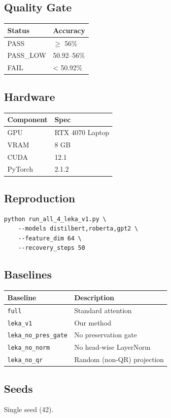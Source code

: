 \subsection{Quality Gate}

\begin{table}[H]
\centering
\small
\begin{tabular}{ll}
\toprule
\textbf{Status} & \textbf{Accuracy} \\
\midrule
PASS & $\ge$ 56\% \\
PASS\_LOW & 50.92--56\% \\
FAIL & < 50.92\% \\
\bottomrule
\end{tabular}
\end{table}

\subsection{Hardware}

\begin{table}[H]
\centering
\small
\begin{tabular}{ll}
\toprule
\textbf{Component} & \textbf{Spec} \\
\midrule
GPU & RTX 4070 Laptop \\
VRAM & 8 GB \\
CUDA & 12.1 \\
PyTorch & 2.1.2 \\
\bottomrule
\end{tabular}
\end{table}

\subsection{Reproduction}

\begin{lstlisting}
python run_all_4_leka_v1.py \
    --models distilbert,roberta,gpt2 \
    --feature_dim 64 \
    --recovery_steps 50
\end{lstlisting}

\subsection{Baselines}

\begin{table}[H]
\centering
\small
\begin{tabular}{ll}
\toprule
\textbf{Baseline} & \textbf{Description} \\
\midrule
\texttt{full} & Standard attention \\
\texttt{leka\_v1} & Our method \\
\texttt{leka\_no\_pres\_gate} & No preservation gate \\
\texttt{leka\_no\_norm} & No head-wise LayerNorm \\
\texttt{leka\_no\_qr} & Random (non-QR) projection \\
\bottomrule
\end{tabular}
\end{table}

\subsection{Seeds}

Single seed (42).

